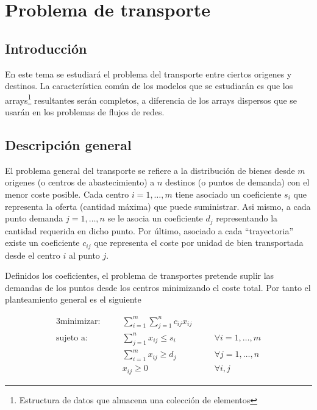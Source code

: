 \section{Problema de transporte}

\subsection{Introducción}
En este tema se estudiará el problema del transporte entre ciertos origenes y destinos. La característica común de los
modelos que se estudiarán es que los arrays\footnote{Estructura de datos que almacena una colección de elementos} resultantes 
serán completos, a diferencia de los arrays dispersos que se usarán en los problemas de flujos de redes.

\subsection{Descripción general}

El problema general del transporte se refiere a la distribución de bienes desde $m$ origenes (o centros de abastecimiento)
a $n$ destinos (o puntos de demanda) con el menor coste posible. Cada centro $i=1,\dots,m$ tiene asociado un coeficiente
$s_i$ que representa la oferta (cantidad máxima) que puede suministrar. Asi mismo, a cada punto demanda $j=1,\dots,n$ se
le asocia un coeficiente $d_j$ representando la cantidad requerida en dicho punto. Por último, asociado a cada ``trayectoria''
existe un coeficiente $c_{ij}$ que representa el coste por unidad de bien transportada desde el centro $i$ al punto $j$.

Definidos los coeficientes, el problema de transportes pretende suplir las demandas de los puntos desde los centros 
minimizando el coste total. Por tanto el planteamiento general es el siguiente

\begin{alignat}{3}
    \text{minimizar:}   & \quad & \sum^m_{i=1}\sum^n_{j=1}c_{ij}x_{ij}     & \quad &                        \label{eq:1}\\
    \text{sujeto a:}    & \quad & \sum^n_{j=1}x_{ij}\leq s_i               &       & \forall i=1,\dots,m    \label{eq:2}\\
                        & \quad & \sum^m_{i=1}x_{ij}\geq d_j               &       & \forall j=1,\dots,n    \label{eq:3}\\
                        & \quad & x_{ij}\geq 0                             &       & \forall i,j            \label{eq:4}
\end{alignat}

